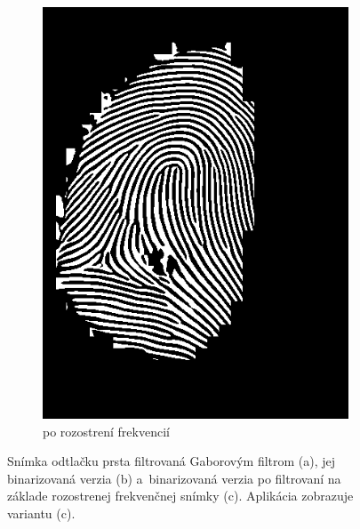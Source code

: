 \begin{figure}[h]
\begin{subfigure}[b]{0.3\linewidth}
      \includegraphics[width=\linewidth]{obrazky-figures/gabor_filtered_binarized_freq_blur.png}
      \caption{po rozostrení frekvencií}
      \label{obr:gabor_binar_freq_blur}
    \end{subfigure}
    \caption{Snímka odtlačku prsta filtrovaná Gaborovým filtrom (a), jej binarizovaná verzia (b) a~binarizovaná verzia po filtrovaní na základe rozostrenej
            frekvenčnej snímky (c). Aplikácia zobrazuje variantu (c).}
    \label{obr:gabor}
  \end{figure}

